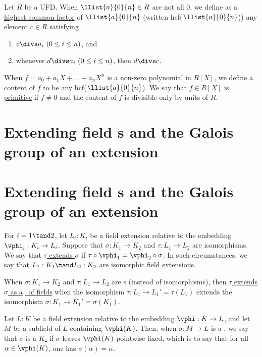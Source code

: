 \documentclass{article}
\begin{document}
  \begin{tdefinition}
    Let \( R \) be a UFD. When \( \llist{a}{0}{n}\in R \) are not all 0, we define as a \ul{highest common factor} of \( \llist{a}{0}{n} \) (written hcf(\( \llist{a}{0}{n} \))) any element \( c\in R \) satisfying \begin{enumerate}[label=(\roman*)]
      \item \( c\divs a_i\ (0\leq i\leq n) \), and
      \item whenever \( d\divs a_i\ (0\leq i\leq n) \), then \( d\divs c \).
    \end{enumerate}
    When \( f=a_0+a_1X+\ldots +a_nX^n \) is a non-zero polynomial in \( R[X] \), we define a \ul{content} of \( f \) to be any hcf(\( \llist{a}{0}{n} \)).
    We say that \( f\in R[X] \) is \ul{primitive} if \( f\neq 0 \) and the content of \( f \) is divisible only by units of \( R \).
  \end{tdefinition}

\section{Extending field \homo s and the Galois group of an extension}
\setcounter{tdefinition}{15}
\setcounter{section}{2}
  \section{Extending field \homo s and the Galois group of an extension}
  \begin{tdefinition}
    For \( i = 1 \tand 2 \), let \( L_i : K_i \) be a field extension relative to the embedding \( \vphi_i : K_i\to L_i \).
    Suppose that \( \sigma :K_1\to K_2 \) and \( \tau:L_1\to L_2 \) are isomorphisms.
    We say that \ul{\( \tau \) extends \( \sigma \)} if \( \tau\circ\vphi_1 = \vphi_2\circ\sigma \).
    In such circumstances, we say that \( L_1 : K_1 \tand L_2 : K_2 \) are \ul{isomorphic field extensions}.

    When \( \sigma:K_1\to K_2 \) and \( \tau:L_1\to L_2 \) are \homo s (instead of isomorphisms), then \ul{\( \tau \) extends \( \sigma \) as a} \ul{\homo~of fields} when the isomorphism \( \tau:L_1\to L_1' = \tau(L_1) \) extends the isomorphism \( \sigma:K_1\to K_1' = \sigma(K_1) \).
  \end{tdefinition}

  \begin{tdefinition}[\( F \)-\homo]
    Let \(L : K\) be a field extension relative to the embedding \(\vphi : K \to L\), and let \(M\) be a subfield of \(L\) containing \(\vphi(K)\).
    Then, when \(\sigma : M \to L\) is a \homo, we say that \(\sigma\) is a \ul{\(K\)-\homo} if \(\sigma\) leaves \(\vphi(K)\) pointwise fixed, which is to say that for all \(\alpha \in \vphi(K)\), one has \( \sigma(\alpha) = \alpha \).
  \end{tdefinition}
\end{document}
